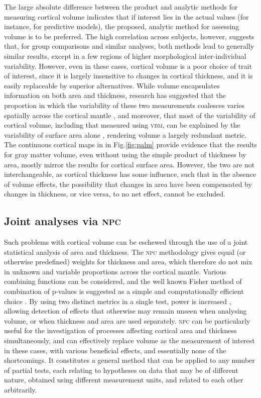 The large absolute difference between the product and analytic methods for measuring cortical volume indicates that if interest lies in the actual values (for instance, for predictive models), the proposed, analytic method for assessing volume is to be preferred. The high correlation across subjects, however, suggests that, for group comparisons and similar analyses, both methods lead to generally similar results, except in a few regions of higher morphological inter-individual variability. However, even in these cases, cortical volume is a poor choice of trait of interest, since it is largely insensitive to changes in cortical thickness, and it is easily replaceable by superior alternatives. While volume encapsulates information on both area and thickness, research has suggested that the proportion in which the variability of these two measurements coalesces varies spatially across the cortical mantle \citep{Winkler2010}, and moreover, that most of the variability of cortical volume, including that measured using \textsc{vbm}, can be explained by the variability of surface area alone \citep{Voets2008, Lenroot2009, Winkler2010, Rimol2012}, rendering volume a largely redundant metric. The continuous cortical maps in in Fig.\ref{fig:palm} provide evidence that the results for gray matter volume, even without using the simple product of thickness by area, mostly mirror the results for cortical surface area. However, the two are not interchangeable, as cortical thickness has some influence, such that in the absence of volume effects, the possibility that changes in area have been compensated by changes in thickness, or vice versa, to no net effect, cannot be excluded.

\subsection{Joint analyses via \textsc{npc}}

Such problems with cortical volume can be eschewed through the use of a joint statistical analysis of area and thickness. The \textsc{npc} methodology gives equal (or otherwise predefined) weights for thickness and area, which therefore do not mix in unknown and variable proportions across the cortical mantle. Various combining functions can be considered, and the well known Fisher method of combination of p-values is suggested as a simple and computationally efficient choice \citep{Fisher1932}. By using two distinct metrics in a single test, power is increased \citep{Pesarin2010, Winkler2016_npc}, allowing detection of effects that otherwise may remain unseen when analysing volume, or when thickness and area are used separately. \textsc{npc} can be particularly useful for the investigation of processes affecting cortical area and thickness simultaneously, and can effectively replace volume as the measurement of interest in these cases, with various beneficial effects, and essentially none of the shortcomings. It constitutes a general method that can be applied to any number of partial tests, each relating to hypotheses on data that may be of different nature, obtained using different measurement units, and related to each other arbitrarily.

